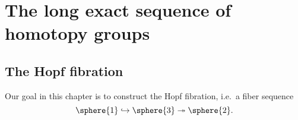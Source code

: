 \chapter{The long exact sequence of homotopy groups}

\section{The Hopf fibration}
Our goal in this chapter is to construct the Hopf fibration, i.e.~a fiber sequence
\begin{equation*}
\sphere{1}\hookrightarrow\sphere{3}\twoheadrightarrow\sphere{2}.
\end{equation*}
